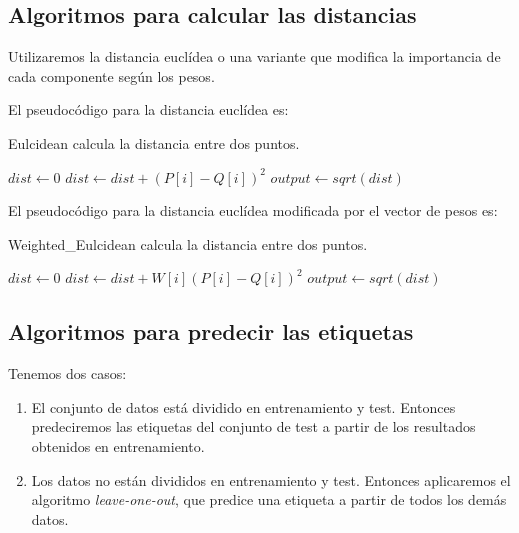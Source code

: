 \documentclass[11pt,a4paper]{article}
\begin{document}
\subsection{Algoritmos para calcular las distancias}

Utilizaremos la distancia euclídea o una variante que modifica la importancia de cada componente según los pesos.

El pseudocódigo para la distancia euclídea es: \\
\begin{algorithm}[H]
	\caption{{\sc Eulcidean} calcula la distancia entre dos puntos.}
	
	$dist \gets 0$ \;
	 {
		$dist \gets dist + (P[i] - Q[i])^{2}$ \;
	}
	$output \gets sqrt(dist)$ \;
	 \;
\end{algorithm}

El pseudocódigo para la distancia euclídea modificada por el vector de pesos es: \\
\begin{algorithm}[H]
	\caption{{\sc Weighted\_Eulcidean} calcula la distancia entre dos puntos.}
	
	$dist \gets 0$ \;
	 {
		 {
			$dist \gets dist + W[i] (P[i] - Q[i])^{2}$ \;
		}
	}
	$output \gets sqrt(dist)$ \;
	 \;
\end{algorithm}

\subsection{Algoritmos para predecir las etiquetas}

Tenemos dos casos:
\begin{enumerate}
\item El conjunto de datos está dividido en entrenamiento y test. Entonces predeciremos las etiquetas del conjunto de test a partir de los resultados obtenidos en entrenamiento.
\item Los datos no están divididos en entrenamiento y test. Entonces aplicaremos el algoritmo \emph{leave-one-out}, que predice una etiqueta a partir de todos los demás datos.
\end{enumerate}
\end{document}
